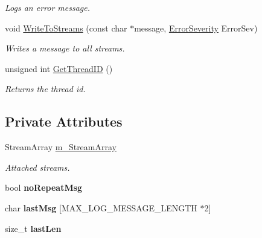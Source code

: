 \begin{DoxyCompactItemize}
\begin{DoxyCompactList}\small\item\em Logs an error message. \end{DoxyCompactList}\item 
void \hyperlink{class_assimp_1_1_default_logger_ac5d0ad395b5c07bbfed643b440d23316}{Write\+To\+Streams} (const char $\ast$message, \hyperlink{class_assimp_1_1_logger_acd0b52a87d6fc11e957ed2c6e2ad75b6}{Error\+Severity} Error\+Sev)\hypertarget{class_assimp_1_1_default_logger_ac5d0ad395b5c07bbfed643b440d23316}{}\label{class_assimp_1_1_default_logger_ac5d0ad395b5c07bbfed643b440d23316}

\begin{DoxyCompactList}\small\item\em Writes a message to all streams. \end{DoxyCompactList}\item 
unsigned int \hyperlink{class_assimp_1_1_default_logger_a2db9c3b56c8be09b1827d1d0522c02b9}{Get\+Thread\+ID} ()
\begin{DoxyCompactList}\small\item\em Returns the thread id. \end{DoxyCompactList}\end{DoxyCompactItemize}
\subsection*{Private Attributes}
\begin{DoxyCompactItemize}
\item 
Stream\+Array \hyperlink{class_assimp_1_1_default_logger_aa8e6680480049800a8d341bb18b44757}{m\+\_\+\+Stream\+Array}\hypertarget{class_assimp_1_1_default_logger_aa8e6680480049800a8d341bb18b44757}{}\label{class_assimp_1_1_default_logger_aa8e6680480049800a8d341bb18b44757}

\begin{DoxyCompactList}\small\item\em Attached streams. \end{DoxyCompactList}\item 
bool {\bfseries no\+Repeat\+Msg}\hypertarget{class_assimp_1_1_default_logger_abbdb886a46779b97dda3b4dd7d488403}{}\label{class_assimp_1_1_default_logger_abbdb886a46779b97dda3b4dd7d488403}

\item 
char {\bfseries last\+Msg} \mbox{[}M\+A\+X\+\_\+\+L\+O\+G\+\_\+\+M\+E\+S\+S\+A\+G\+E\+\_\+\+L\+E\+N\+G\+TH $\ast$2\mbox{]}\hypertarget{class_assimp_1_1_default_logger_a1951bc73596394828a33747c38317dea}{}\label{class_assimp_1_1_default_logger_a1951bc73596394828a33747c38317dea}

\item 
size\+\_\+t {\bfseries last\+Len}\hypertarget{class_assimp_1_1_default_logger_a8be3bce1f3850a619192e0561a4c6cfc}{}\label{class_assimp_1_1_default_logger_a8be3bce1f3850a619192e0561a4c6cfc}

\end{DoxyCompactItemize}
